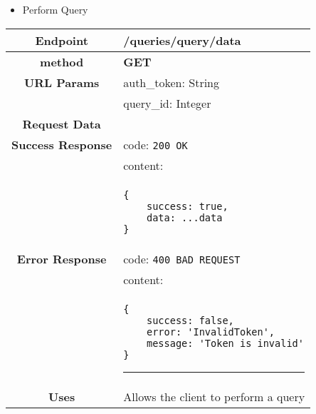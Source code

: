     \begin{itemize}
        \item Perform Query
    \end{itemize}
    \begin{adjustwidth}{1cm}{}
        \begin{longtable}{|c|l|}
            \hline
            \textbf{Endpoint} & /queries/query/data \\
            \hline
            \textbf{method} & \textbf{GET} \\
            \hline
            \textbf{URL Params} &  auth\_token: String \\
            &  query\_id: Integer \\
            \hline
            \textbf{Request Data} & \\
            \hline
            \textbf{Success Response} & code: \texttt{200 OK} \\
            &                           content: \\
            & \begin{minipage}[t]{0.5\textwidth}
                \begin{adjustwidth}{1.5cm}{}
                \begin{verbatim}
{
    success: true, 
    data: ...data
}
                \end{verbatim}
                \end{adjustwidth}
              \end{minipage} \\
              \hline
            \textbf{Error Response} & code: \texttt{400 BAD REQUEST} \\
              &                     content: \\
              & \begin{minipage}[t]{0.7\textwidth}
                \begin{adjustwidth}{1.5cm}{}
                \begin{verbatim}
{
    success: false, 
    error: 'InvalidToken',
    message: 'Token is invalid'
}
                \end{verbatim}
                \end{adjustwidth}
                \par\noindent\rule{\textwidth}{1pt}
                 \vspace{4pt}
              \end{minipage} \\
              \hline
            \textbf{Uses} & Allows the client to perform a query \\
            \hline
        \end{longtable}
    \end{adjustwidth} 
    
